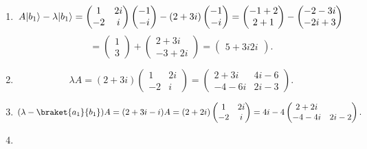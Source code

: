 \documentclass[11pt, letterpaper]{article}
\begin{document}
\begin{enumerate}
\[\begin{pmatrix}
			2+1
			\end{pmatrix}^{\dagger} =\begin{pmatrix}
			1 & 3
			\end{pmatrix}
		.\]
	\item
		\[
			A \lvert b_1\rangle -\lambda \lvert b_1\rangle =\begin{pmatrix}
			1 & 2i \\
			-2 & i
			\end{pmatrix}\begin{pmatrix}
			-1 \\
			-i
			\end{pmatrix}-(2+3i)\begin{pmatrix}
			-1 \\
			-i
			\end{pmatrix}=\begin{pmatrix}
			-1+2 \\
			2+1
			\end{pmatrix}-\begin{pmatrix}
			-2-3i \\
			-2i+3
			\end{pmatrix}
		\]
		\[
			=\begin{pmatrix}
			1 \\
			3
			\end{pmatrix}+\begin{pmatrix}
			2+3i \\
			-3+2i
			\end{pmatrix}=\begin{pmatrix}
			5+3i 
			2i
			\end{pmatrix}
		.\]
	\item
		\[
			\lambda A = (2+3i)\begin{pmatrix}
			1 & 2i \\
			-2 & i
			\end{pmatrix}=\begin{pmatrix}
			2+3i & 4i-6 \\
			-4-6i & 2i-3
			\end{pmatrix}
		.\]
	\item
		\[
			(\lambda -\braket{a_1}{b_1} )A=(2+3i-i)A=(2+2i)\begin{pmatrix}
			1 & 2i \\
			-2 & i
			\end{pmatrix}=4i-4\begin{pmatrix}
			2+2i &  \\
			-4-4i & 2i-2
			\end{pmatrix}
		.\]
	\item 

\end{enumerate}
\end{document}
